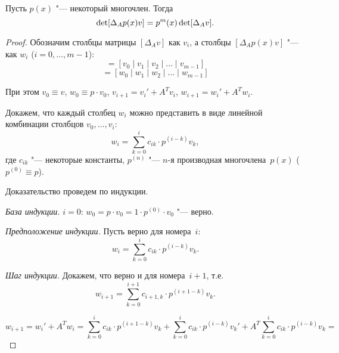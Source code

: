 \begin{proposition}
Пусть $p(x)$ "--- некоторый многочлен. Тогда
\begin{equation*}
    \mathop{\rm det}[\Delta_A p(x)v] = p^{m}(x)\mathop{\rm det}[\Delta_A v].
\end{equation*}
\end{proposition}

\begin{proof}

Обозначим столбцы матрицы $[\Delta_A v]$ как $v_i$, а столбцы $[\Delta_A p(x)v]$ "--- как $w_i$ ($i = 0, \dots, m - 1$):
\begin{equation*}
    [\Delta_A v] = [v_0 \mid v_1 \mid v_2 \mid \dots \mid v_{m-1}]
\end{equation*}
\begin{equation*}
    [\Delta_A p(x)v] = [w_0 \mid w_1 \mid w_2 \mid \dots \mid w_{m-1}]
\end{equation*}

При этом $v_0 \equiv v$, $w_0 \equiv p \cdot v_0$, $v_{i+1} = v_{i}' + A^T v_{i}$, $w_{i+1} = w_{i}' + A^T w_{i}$.

Докажем, что каждый столбец $w_i$ можно представить в виде
линейной комбинации столбцов $v_0, \dots, v_i$:
\begin{equation*}
    w_i = \sum\limits_{k = 0}^i c_{ik} \cdot p^{(i - k)} v_k,
\end{equation*}
где $c_{ik}$ "--- некоторые константы, $p^{(n)}$ "--- $n$-я производная многочлена~$p(x)$ ($p^{(0)} \equiv p$).

Доказательство проведем по индукции.

\emph{База индукции.} $i = 0$: $w_0 = p \cdot v_0 = 1 \cdot p^{(0)} \cdot v_0$ "--- верно.

\emph{Предположение индукции.} Пусть верно для номера~$i$:
\begin{equation*}
    w_i = \sum\limits_{k = 0}^i c_{ik} \cdot p^{(i - k)} v_k.
\end{equation*}

\emph{Шаг индукции.} Докажем, что верно и для номера~$i + 1$, т.е.
\begin{equation*}
    w_{i+1} = \sum\limits_{k = 0}^{i+1} c_{i+1, k} \cdot p^{(i + 1 - k)} v_k.
\end{equation*}

\begin{equation*}
    w_{i+1} = w_{i}' + A^T w_{i} = \sum\limits_{k = 0}^i c_{ik} \cdot p^{(i + 1 - k)} v_k +
    \sum\limits_{k = 0}^i c_{ik} \cdot p^{(i - k)} v_k' + A^T \sum\limits_{k = 0}^i c_{ik} \cdot p^{(i - k)} v_k =
\end{equation*}


\end{proof}
